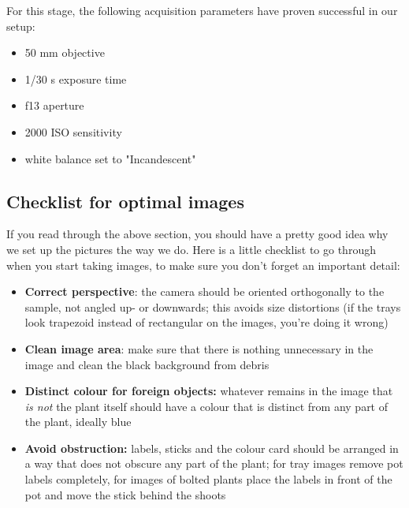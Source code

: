 \documentclass[10pt]{article}
\begin{document}
\noindent For this stage, the following acquisition parameters have proven successful in our setup:

\begin{itemize}
	\item 50 mm objective
	\item 1/30 s exposure time
	\item f13 aperture
	\item 2000 ISO sensitivity
	\item white balance set to "Incandescent"
\end{itemize}

\subsection{Checklist for optimal images}

If you read through the above section, you should have a pretty good idea why we set up the pictures the way we do. Here is a little checklist to go through when you start taking images, to make sure you don't forget an important detail:

\begin{itemize}[label=$\square$]
\item \textbf{Correct perspective}: the camera should be oriented orthogonally to the sample, not angled up- or downwards; this avoids size distortions (if the trays look trapezoid instead of rectangular on the images, you're doing it wrong)
\item \textbf{Clean image area}: make sure that there is nothing unnecessary in the image and clean the black background from debris
\item \textbf{Distinct colour for foreign objects:} whatever remains in the image that \textit{is not} the plant itself should have a colour that is distinct from any part of the plant, ideally blue
\item \textbf{Avoid obstruction:} labels, sticks and the colour card should be arranged in a way that does not obscure any part of the plant; for tray images remove pot labels completely, for images of bolted plants place the labels in front of the pot and move the stick behind the shoots
\end{itemize}
\end{document}
